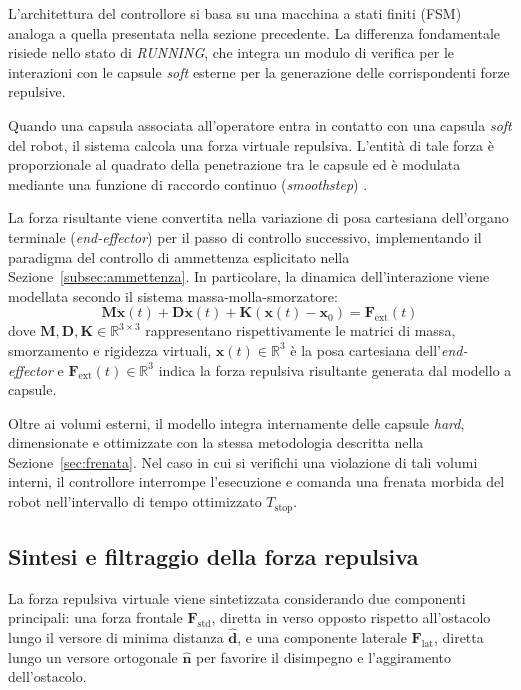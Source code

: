 L'architettura del controllore si basa su una macchina a stati finiti (FSM) analoga a quella presentata nella sezione precedente. La differenza fondamentale risiede nello stato di \textit{RUNNING}, che integra un modulo di verifica per le interazioni con le capsule \textit{soft} esterne per la generazione delle corrispondenti forze repulsive.

Quando una capsula associata all'operatore entra in contatto con una capsula \textit{soft} del robot, il sistema calcola una forza virtuale repulsiva. L'entità di tale forza è proporzionale al quadrato della penetrazione tra le capsule ed è modulata mediante una funzione di raccordo continuo (\textit{smoothstep}) \cite{Qyrani2026}.

La forza risultante viene convertita nella variazione di posa cartesiana dell'organo terminale (\textit{end-effector}) per il passo di controllo successivo, implementando il paradigma del controllo di ammettenza esplicitato nella Sezione~\ref{subsec:ammettenza}. In particolare, la dinamica dell'interazione viene modellata secondo il sistema massa-molla-smorzatore:
\begin{equation}
\boldsymbol{M} \ddot{\boldsymbol{x}}(t) + \boldsymbol{D} \dot{\boldsymbol{x}}(t) + \boldsymbol{K} (\boldsymbol{x}(t) - \boldsymbol{x}_0) = \boldsymbol{F}_{\text{ext}}(t)
\end{equation}
dove $\boldsymbol{M}, \boldsymbol{D}, \boldsymbol{K} \in \mathbb{R}^{3 \times 3}$ rappresentano rispettivamente le matrici di massa, smorzamento e rigidezza virtuali, $\boldsymbol{x}(t) \in \mathbb{R}^3$ è la posa cartesiana dell'\textit{end-effector} e $\boldsymbol{F}_{\text{ext}}(t) \in \mathbb{R}^3$ indica la forza repulsiva risultante generata dal modello a capsule.

Oltre ai volumi esterni, il modello integra internamente delle capsule \textit{hard}, dimensionate e ottimizzate con la stessa metodologia descritta nella Sezione~\ref{sec:frenata}. Nel caso in cui si verifichi una violazione di tali volumi interni, il controllore interrompe l'esecuzione e comanda una frenata morbida del robot nell'intervallo di tempo ottimizzato $T_{\text{stop}}$.

\subsection{Sintesi e filtraggio della forza repulsiva}

La forza repulsiva virtuale viene sintetizzata considerando due componenti principali: una forza frontale $\boldsymbol{F}_{\text{std}}$, diretta in verso opposto rispetto all'ostacolo lungo il versore di minima distanza $\hat{\boldsymbol{d}}$, e una componente laterale $\boldsymbol{F}_{\text{lat}}$, diretta lungo un versore ortogonale $\hat{\boldsymbol{n}}$ per favorire il disimpegno e l'aggiramento dell'ostacolo.

